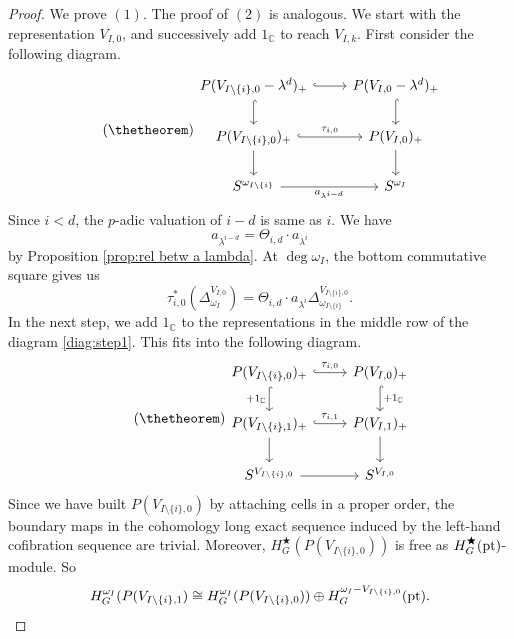 \documentclass[a4paper,leqno,11pt]{amsart}
\theoremstyle{plain}
\theoremstyle{definition}
\theoremstyle{remark}
\theoremstyle{definition}
\newcommand{\C}{{\mathbb C}}
\newenvironment{myeq}[1][]
{\stepcounter{theorem}\begin{equation}\tag{\thetheorem}{#1}}
	{\end{equation}}
\def\C{\mathbb{C}}
\numberwithin{equation}{section}
\newcommand{\pt}{\textup{pt}}
\begin{document}
	\begin{proof}
		We prove $ (1) $. The proof of $ (2) $ is analogous.	We start with the representation $ V_{I,0} $, and successively add $ 1_\C $ to reach $ V_{I,k} $.  First consider the  following diagram. 
		\begin{myeq}\label{diag:step1}
			\begin{tikzcd}
				P(V_{I\setminus\{ i\},0}-\lambda^d)_+ \ar[r, hook, ""] \arrow[d,hook] & P(V_{I,0}-\lambda^d)_+\ar[d,hook, ""] \\
				P(V_{I\setminus\{ i\},0})_+ \ar[r, hook, "\tau_{i,0}"] \ar[d] & P(V_{I,0})_+\arrow[d, ""] \\
				S^{\omega _{I\setminus\{ i\}}} \ar[r, "a_{\lambda^{i-d}}"']                       & S^{\omega _I}          
			\end{tikzcd}  
		\end{myeq}	
		Since $ i<d $, the $ p $-adic valuation of $ i-d $ is same as $ i $. We have
		\begin{myeq}\label{eq:a lambda idntific}
			a_{\lambda^{i-d}} = \Theta_{i,d}\cdot a_{\lambda^i}
		\end{myeq}
		by Proposition \ref{prop:rel betw a lambda}. At $ \deg \omega _I $, the bottom commutative square gives us 
		\[
		\tau _{i,0}^*(\Delta_{\omega _I}^{V_{I,0}})=\Theta_{i,d}\cdot a_{\lambda^i}\Delta_{\omega_{I\setminus\{ i\}} }^{V_{I\setminus \{i\},0}}.
		\]
		In the next step, we add $ 1_\C $ to the representations in the middle row  of the  diagram \eqref{diag:step1}. This fits into the following diagram.
		\begin{myeq}\label{diag:step2}
			\begin{tikzcd}
				P(V_{I\setminus\{ i\},0})_+ \ar[r, hook, "\tau_{i,0}"] \arrow[d,hook,"+1_\C"'] & P(V_{I,0})_+\ar[d,hook, "+1_\C"] \\
				P(V_{I\setminus\{ i\},1})_+ \ar[r, hook, "\tau_{i,1}"] \ar[d] & P(V_{I,1})_+\arrow[d, ""] \\
				S^{V_{I\setminus\{ i\},0}} \ar[r, ""']                       & S^{V_{I,0}}          
			\end{tikzcd}  
		\end{myeq}	
		Since we have built $ P(V_{I\setminus\{ i\},0}) $ by attaching cells in a proper order, the boundary maps in the cohomology long exact sequence induced by the left-hand cofibration sequence are trivial. Moreover, $ H^\bigstar_G(P(V_{I\setminus\{ i\},0}) ) $ is free as $ H^\bigstar_G(\pt) $-module. So 
		\[
		H^{\omega _I}_G(P(V_{I\setminus\{ i\},1})\cong H^{\omega _I}_G(P(V_{I\setminus\{ i\},0}))\oplus H^{\omega _I-{V_{I\setminus \{i\},0}}}_G(\pt). 
\]
\end{proof}
\end{document}

